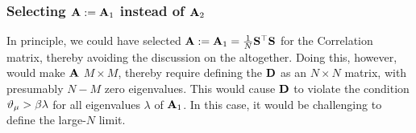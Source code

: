 \subsubsection{Selecting $\mathbf{A}:=\mathbf{A}_{1}$ instead of $\mathbf{A}_{2}$}
\label{sxn:tanaka_end}
In principle, we could have selected $\mathbf{A}:=\mathbf{A}_{1}=\tfrac{1}{N}{\mathbf{S}}^{\top}{\mathbf{S}}$  for the \Student Correlation matrix,
thereby avoiding the discussion on the \DualityOfMeasures altogether.
Doing this, however, would make $\mathbf{A}$ $M\times M$, thereby
require defining the \SourceMatrix $\mathbf{D}$ as an
$N \times N$ matrix, with presumably $N-M$ zero eigenvalues.
This would cause $\mathbf{D}$ to violate the condition $\vartheta_{\mu} > \beta\lambda$
for all eigenvalues $\lambda$ of $\mathbf{A}_{1}$.
In this case, it would be challenging to define the large-$N$ limit.
